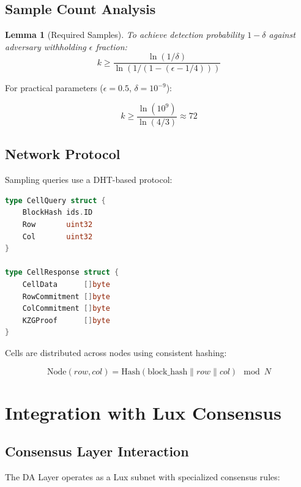 \documentclass[11pt,a4paper]{article}
\newtheorem{lemma}{Lemma}
\begin{document}
\subsection{Sample Count Analysis}

\begin{lemma}[Required Samples]
To achieve detection probability $1 - \delta$ against adversary withholding $\epsilon$ fraction:
\begin{equation}
    k \geq \frac{\ln(1/\delta)}{\ln(1/(1-(\epsilon - 1/4)))}
\end{equation}
\end{lemma}

For practical parameters ($\epsilon = 0.5$, $\delta = 10^{-9}$):

\begin{equation}
    k \geq \frac{\ln(10^9)}{\ln(4/3)} \approx 72
\end{equation}

\subsection{Network Protocol}

Sampling queries use a DHT-based protocol:

\begin{lstlisting}[language=Go, caption=Cell query protocol]
type CellQuery struct {
    BlockHash ids.ID
    Row       uint32
    Col       uint32
}

type CellResponse struct {
    CellData      []byte
    RowCommitment []byte
    ColCommitment []byte
    KZGProof      []byte
}
\end{lstlisting}

Cells are distributed across nodes using consistent hashing:

\begin{equation}
    \text{Node}(row, col) = \text{Hash}(\text{block\_hash} \| row \| col) \mod N
\end{equation}

\section{Integration with Lux Consensus}

\subsection{Consensus Layer Interaction}

The DA Layer operates as a Lux subnet with specialized consensus rules:
\end{document}

